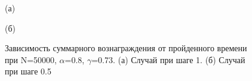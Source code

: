 \documentclass[a4paper]{report}
\theoremstyle{definition}
\theoremstyle{plain}
\theoremstyle{remark}
\theoremstyle{remark}
\theoremstyle{definition}
\begin{document}
\begin{figure}[H]
    \begin{minipage}[H]{0.49\linewidth}
        (а)\\
    \end{minipage}
    \hfill
    \begin{minipage}[H]{0.49\linewidth}
        (б)\\
    \end{minipage}
     \caption{Зависимость суммарного вознаграждения от пройденного времени при N=50000, $\alpha$=0.8, $\gamma$=0.73. (а) Случай при шаге 1. (б) Случай при шаге 0.5}
\end{figure}
\end{document}
